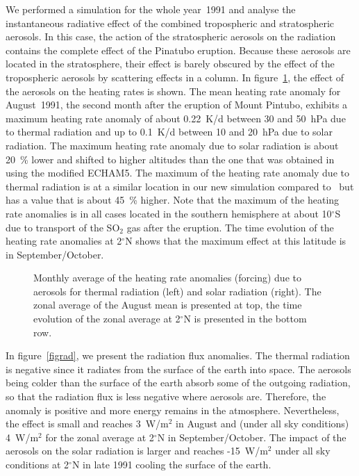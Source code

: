 \begin{appendix}
We performed a simulation for the whole year~1991 and analyse the
instantaneous radiative effect of the combined tropospheric and
stratospheric aerosols. In this case, the action of the stratospheric
aerosols on the radiation contains the complete effect of the Pinatubo
eruption. Because these aerosols are located in the stratosphere,
their effect is barely
obscured by the effect of the tropospheric aerosols by scattering
effects in a column.
In figure~\ref{fig_tanomaly}, the effect of the aerosols on the
heating rates is shown. The mean heating rate anomaly for August~1991,
the second 
month after the eruption of Mount Pintubo, exhibits a maximum heating
rate anomaly of about 0.22~K/d between 30 and 50~hPa due to thermal radiation
and up to 0.1~K/d between 10 and 20~hPa due to solar radiation. The
maximum heating rate anomaly due to solar radiation is about 20~\%
lower and shifted to higher altitudes than the one that was obtained
in~\cite[p.~42]{tho2008} using the modified ECHAM5. The maximum of the
heating rate anomaly due to thermal radiation is at a similar location
in our new simulation compared to~\cite[p.~22]{tho2008} but has a
value that is about 45~\% higher. Note that the maximum of the heating
rate anomalies is in all cases located in the southern hemisphere at
about 10$^\circ$S due to transport of the SO$_2$ gas after the
eruption. The time evolution of the heating rate 
anomalies at 2$^\circ$N shows that the maximum effect at this
latitude is in September/October.

\begin{figure}
\vspace{-4cm}
\pctfour
{\vspace{-1.7cm}\hspace{0.2cm}}
{\vspace{-1.7cm}}
{\hspace{0.2cm}\rule{0cm}{3.5cm}}
{}
\caption{Monthly average of the heating rate anomalies (forcing) due
  to aerosols for thermal radiation (left) and solar radiation
  (right). The zonal average of the August mean is presented at top,
  the time evolution of the zonal average at 2$^\circ$N is presented
  in the bottom row.}\label{fig_tanomaly}
\end{figure}

In figure~\ref{figrad}, we present the radiation flux anomalies.
The thermal radiation is negative since it radiates from the surface
of the earth into space. The aerosols being colder than the surface of
the earth absorb some of the outgoing
radiation, so that the radiation flux is less negative where aerosols
are. Therefore, the anomaly is positive and more energy remains in the
atmosphere. Nevertheless, the effect is small and reaches 3~W/m$^2$
in August and (under all sky conditions) 4~W/m$^2$
for the zonal average at 2$^\circ$N in September/October. The impact
of the aerosols on the solar radiation is larger and reaches
-15~W/m$^2$ under all sky conditions at 2$^\circ$N in late 1991
cooling the surface of the earth.


\end{appendix}
